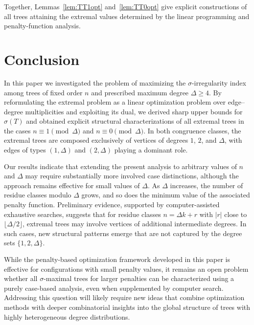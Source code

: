 \documentclass[preprint,12pt]{elsarticle}
\begin{document}
Together, Lemmas~\ref{lem:TT1opt} and~\ref{lem:TT0opt} give explicit constructions
of all trees attaining the extremal values determined by the linear programming
and penalty-function analysis.



\section{Conclusion}

In this paper we investigated the problem of maximizing the
$\sigma$-irregularity index among trees of fixed order $n$ and prescribed maximum
degree $\Delta\ge4$.
By reformulating the extremal problem as a linear optimization problem over
edge--degree multiplicities and exploiting its dual, we derived sharp upper
bounds for $\sigma(T)$ and obtained explicit structural characterizations of all
extremal trees in the cases $n\equiv1\pmod{\Delta}$ and $n\equiv0\pmod{\Delta}$.
In both congruence classes, the extremal trees are composed exclusively of
vertices of degrees $1$, $2$, and $\Delta$, with edges of types $(1,\Delta)$ and
$(2,\Delta)$ playing a dominant role.

Our results indicate that extending the present analysis to arbitrary values of
$n$ and $\Delta$ may require substantially more involved case distinctions,
although the approach remains effective for small values of $\Delta$.
As $\Delta$ increases, the number of residue classes modulo $\Delta$ grows, and
so does the minimum value of the associated penalty function.
Preliminary evidence, supported by computer-assisted exhaustive searches,
suggests that for residue classes $n=\Delta k+r$ with $|r|$ close to
$\lfloor\Delta/2\rfloor$, extremal trees may involve vertices of additional
intermediate degrees.
In such cases, new structural patterns emerge that are not captured by the
degree sets $\{1,2,\Delta\}$.

While the penalty-based optimization framework developed in this paper is
effective for configurations with small penalty values, it remains an open
problem whether all $\sigma$-maximal trees for larger penalties can be
characterized using a purely case-based analysis, even when supplemented by
computer search.
Addressing this question will likely require new ideas that combine optimization
methods with deeper combinatorial insights into the global structure of trees
with highly heterogeneous degree distributions.
\end{document}
